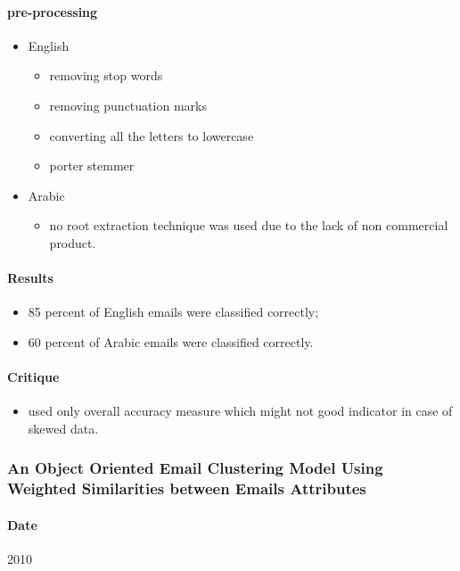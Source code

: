 \documentclass[12pt]{article}
\begin{document}
\paragraph{pre-processing}
\begin{itemize}
    \item English
    \begin{itemize}
        \item removing stop words
        \item removing punctuation marks
        \item converting all the letters to lowercase
        \item porter stemmer
    \end{itemize}
    \item Arabic
    \begin{itemize}
        \item no root extraction technique was used due to the lack of non commercial product.
    \end{itemize}
\end{itemize}

\paragraph{Results}
\begin{itemize}
    \item 85 percent of English emails were classified correctly;
    \item 60 percent of Arabic emails were classified correctly.
\end{itemize}

\paragraph{Critique}
\begin{itemize}
    \item used only overall accuracy measure which might not good indicator in case of skewed data.
\end{itemize}


\subsubsection{An Object Oriented Email Clustering Model Using Weighted Similarities between Emails Attributes}
\paragraph{Date} 2010
\end{document}
